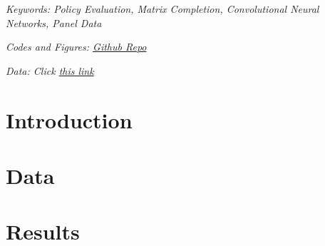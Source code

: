 \documentclass[12pt]{article}
\begin{document}
		
		\bigskip
		\noindent \emph{Keywords: Policy Evaluation, Matrix Completion, Convolutional Neural Networks, Panel Data}
		\vspace{0.2cm}

		\noindent \emph{Codes and Figures: \href{https://github.com/wooyongp/deep-learning-final}{Github Repo}}
		\vspace{0.2cm}

		\noindent \emph{Data: Click \href{https://drive.google.com/uc?id=1wD8h8pjCLDy1RbuPDZBSa3zH45TZL7ha&export=download}{this link}}
		
		
		
		


\newpage

\fontsize{11pt}{11pt}\selectfont
\section{Introduction}



\section{Data}


\section{Results}

\end{document}
